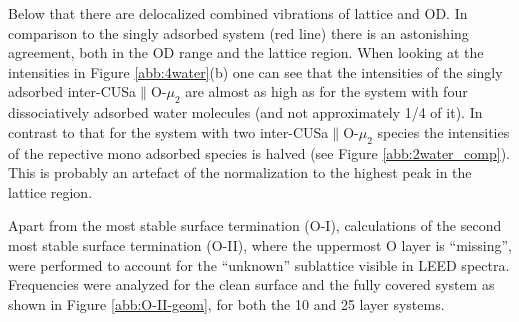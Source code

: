 \documentclass[11pt,DIV=13,BCOR=5mm,a4paper,headinclude]{scrbook}
\begin{document}
Below that there are delocalized combined vibrations of lattice and OD.
In comparison to the singly adsorbed system (red line) there is an astonishing agreement, both in the OD range and the lattice region.
When looking at the intensities in Figure \ref{abb:4water}(b) one can see that the intensities of the singly adsorbed inter-CUSa$\parallel$O-$\mu_2$ are almost as high as for the system with four dissociatively adsorbed water molecules (and not approximately 1/4 of it).
In contrast to that for the system with two inter-CUSa$\parallel$O-$\mu_2$ species the intensities of the repective mono adsorbed species is halved (see Figure \ref{abb:2water_comp}).
This is probably an artefact of the normalization to the highest peak in the lattice region.


Apart from the most stable surface termination (O-I), calculations of the second most stable surface termination (O-II), where the uppermost O layer is ``missing'', were performed to account for the ``unknown'' sublattice visible in LEED spectra.
Frequencies were analyzed for the clean surface and the fully covered system as shown in Figure \ref{abb:O-II-geom}, for both the 10 and 25 layer systems.
\end{document}

